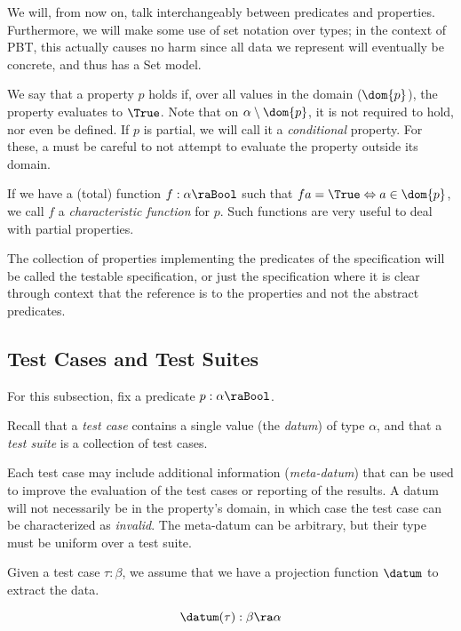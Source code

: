 We will, from now on, talk interchangeably between predicates and properties.
Furthermore, we will make some use of set notation over types; in the context
of PBT, this actually causes no harm since all data we represent will
eventually be concrete, and thus has a Set model.

We say that a property $p$ holds if, over all values in the domain ($\dom{p}$),
the property evaluates to $\True$.  Note that on $\alpha \setminus \dom{p}$, it
is not required to hold, nor even be defined.  If $p$ is partial, we will call
it a \emph{conditional} property.  For these, a \pbt must be careful to not
attempt to evaluate the property outside its domain.

If we have a (total) function $f : \alpha \ra \Bool$ such that 
$f a = \True \Leftrightarrow a \in \dom{p}$, we call $f$ a
\emph{characteristic function} for $p$.  Such functions are very
useful to deal with partial properties.

The collection of properties implementing the predicates of the specification
will be called the testable specification,
or just the specification where it is clear through context that
the reference is to the properties and not the abstract predicates.


\subsection{Test Cases and Test Suites}

For this subsection, fix a predicate $p : \alpha \ra \Bool$.

Recall that a \emph{test case} contains a single value (the \emph{datum}) of
type $\alpha$, and that a \emph{test suite} is a collection of test
cases.

Each test case may include additional information (\emph{meta-datum})
that can be used to improve the evaluation of the test cases or reporting of the results.
A datum will not necessarily be in the property's domain,
in which case the test case can be characterized as \emph{invalid}.
The meta-datum can be arbitrary, but their type must be uniform over a test suite.

Given a test case $\tau : \beta$, we assume that we have a projection function $\datum$
to extract the data.

\begin{df}
$$\datum(\tau) : \beta \ra \alpha$$
\end{df}

